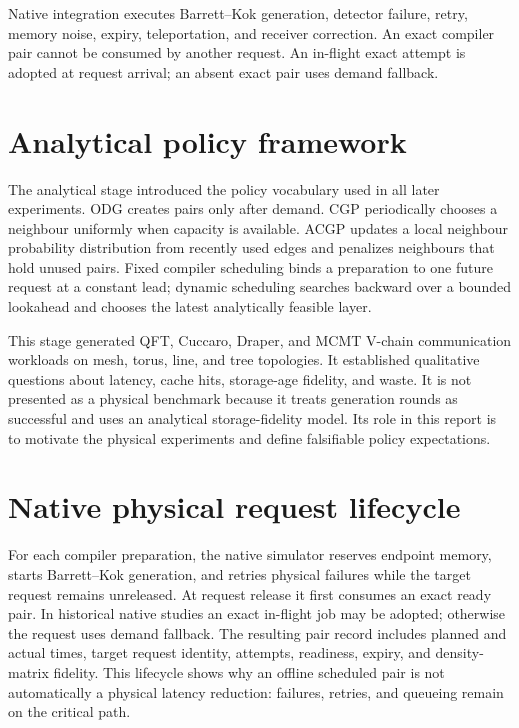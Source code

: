 \documentclass[11pt,a4paper]{report}
\begin{document}
Native integration executes Barrett--Kok generation, detector failure, retry,
memory noise, expiry, teleportation, and receiver correction. An exact compiler
pair cannot be consumed by another request. An in-flight exact attempt is
adopted at request arrival; an absent exact pair uses demand fallback.

\section{Analytical policy framework}
The analytical stage introduced the policy vocabulary used in all later
experiments. ODG creates pairs only after demand. CGP periodically chooses a
neighbour uniformly when capacity is available. ACGP updates a local neighbour
probability distribution from recently used edges and penalizes neighbours that
hold unused pairs. Fixed compiler scheduling binds a preparation to one future
request at a constant lead; dynamic scheduling searches backward over a bounded
lookahead and chooses the latest analytically feasible layer.

This stage generated QFT, Cuccaro, Draper, and MCMT V-chain communication
workloads on mesh, torus, line, and tree topologies. It established qualitative
questions about latency, cache hits, storage-age fidelity, and waste. It is not
presented as a physical benchmark because it treats generation rounds as
successful and uses an analytical storage-fidelity model. Its role in this
report is to motivate the physical experiments and define falsifiable policy
expectations.

\section{Native physical request lifecycle}
For each compiler preparation, the native simulator reserves endpoint memory,
starts Barrett--Kok generation, and retries physical failures while the target
request remains unreleased. At request release it first consumes an exact ready
pair. In historical native studies an exact in-flight job may be adopted;
otherwise the request uses demand fallback. The resulting pair record includes
planned and actual times, target request identity, attempts, readiness, expiry,
and density-matrix fidelity. This lifecycle shows why an offline scheduled pair
is not automatically a physical latency reduction: failures, retries, and
queueing remain on the critical path.
\end{document}
